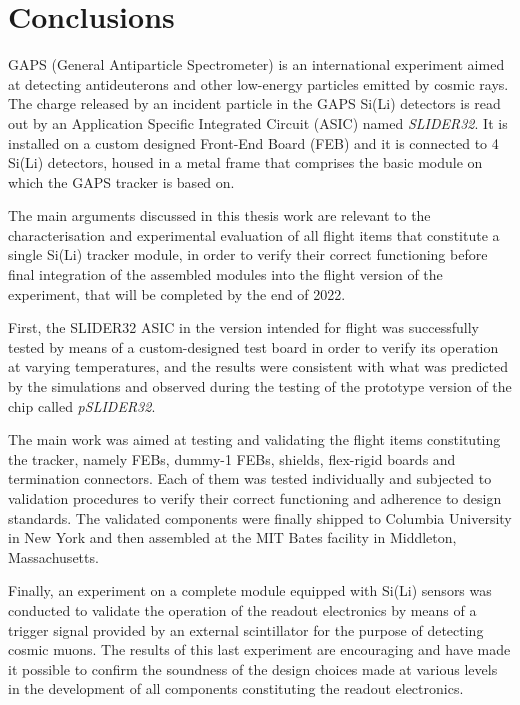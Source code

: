 \chapter*{Conclusions}

\par
GAPS (General Antiparticle Spectrometer) is an international experiment aimed at detecting antideuterons and other low-energy particles emitted by cosmic rays. The charge released by an incident particle in the GAPS Si(Li) detectors is read out by an Application Specific Integrated Circuit (ASIC) named \textit{SLIDER32}. It is installed on a custom designed Front-End Board (FEB) and it is connected to 4 Si(Li) detectors, housed in a metal frame that comprises the basic module on which the GAPS tracker is based on.

\par
The main arguments discussed in this thesis work are relevant to the characterisation and experimental evaluation of all flight items that constitute a single Si(Li) tracker module, in order to verify their correct functioning before final integration of the assembled modules into the flight version of the experiment, that will be completed by the end of 2022.

\par
First, the SLIDER32 ASIC in the version intended for flight was successfully tested by means of a custom-designed test board in order to verify its operation at varying temperatures, and the results were consistent with what was predicted by the simulations and observed during the testing of the prototype version of the chip called \textit{pSLIDER32}.

\par
The main work was aimed at testing and validating the flight items constituting the tracker, namely FEBs, dummy-1 FEBs, shields, flex-rigid boards and termination connectors. Each of them was tested individually and subjected to validation procedures to verify their correct functioning and adherence to design standards. The validated components were finally shipped to Columbia University in New York and then assembled at the MIT Bates facility in Middleton, Massachusetts.

\par
Finally, an experiment on a complete module equipped with Si(Li) sensors was conducted to validate the operation of the readout electronics by means of a trigger signal provided by an external scintillator for the purpose of detecting cosmic muons. The results of this last experiment are encouraging and have made it possible to confirm the soundness of the design choices made at various levels in the development of all components constituting the readout electronics.

